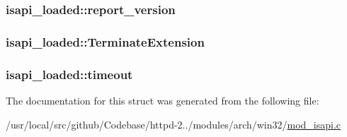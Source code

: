 \subsubsection[{\texorpdfstring{report\+\_\+version}{report_version}}]{ isapi\+\_\+loaded\+::report\+\_\+version}\hypertarget{structisapi__loaded_a1719a4c7dcc25772d3512660fb100d65}{}\label{structisapi__loaded_a1719a4c7dcc25772d3512660fb100d65}
\subsubsection[{\texorpdfstring{Terminate\+Extension}{TerminateExtension}}]{ isapi\+\_\+loaded\+::\+Terminate\+Extension}\hypertarget{structisapi__loaded_a5d171f49a40e1d0278788a8885ddef79}{}\label{structisapi__loaded_a5d171f49a40e1d0278788a8885ddef79}
\subsubsection[{\texorpdfstring{timeout}{timeout}}]{ isapi\+\_\+loaded\+::timeout}\hypertarget{structisapi__loaded_a61a461d72de136e64f159165a3b0deed}{}\label{structisapi__loaded_a61a461d72de136e64f159165a3b0deed}


The documentation for this struct was generated from the following file\+:\begin{DoxyCompactItemize}
\item 
/usr/local/src/github/\+Codebase/httpd-\/2../modules/arch/win32/\hyperlink{mod__isapi_8c}{mod\+\_\+isapi.\+c}\end{DoxyCompactItemize}
